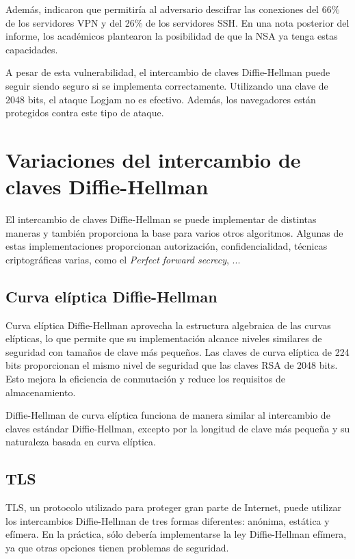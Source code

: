 \documentclass[11pt]{article}
\begin{document}
Además, indicaron que permitiría al adversario descifrar las conexiones del 66$\%$ de los servidores VPN y del 26$\%$ de los servidores SSH. En una nota posterior del informe, los académicos plantearon la posibilidad de que la NSA ya tenga estas capacidades.

A pesar de esta vulnerabilidad, el intercambio de claves Diffie-Hellman puede seguir siendo seguro si se implementa correctamente. Utilizando una clave de 2048 bits, el ataque Logjam no es efectivo. Además, los navegadores están protegidos contra este tipo de ataque.

\section{Variaciones del intercambio de claves Diffie-Hellman}

El intercambio de claves Diffie-Hellman se puede implementar de distintas maneras y también proporciona la base para varios otros algoritmos. Algunas de estas implementaciones proporcionan autorización, confidencialidad, técnicas criptográficas varias, como el \emph{Perfect forward secrecy}, ...

\subsection{Curva elíptica Diffie-Hellman}
Curva elíptica Diffie-Hellman aprovecha la estructura algebraica de las curvas elípticas, lo que permite que su implementación alcance niveles similares de seguridad con tamaños de clave más pequeños. Las claves de curva elíptica de 224 bits proporcionan el mismo nivel de seguridad que las claves RSA de 2048 bits. Esto mejora la eficiencia de conmutación y reduce los requisitos de almacenamiento.

Diffie-Hellman de curva elíptica funciona de manera similar al intercambio de claves estándar Diffie-Hellman, excepto por la longitud de clave más pequeña y su naturaleza basada en curva elíptica.

\subsection{TLS}

TLS, un protocolo utilizado para proteger gran parte de Internet, puede utilizar los intercambios Diffie-Hellman de tres formas diferentes: anónima, estática y efímera. En la práctica, sólo debería implementarse la ley Diffie-Hellman efímera, ya que otras opciones tienen problemas de seguridad.
\end{document}
